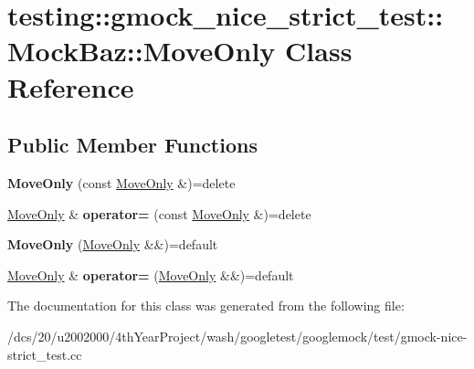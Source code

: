 \hypertarget{classtesting_1_1gmock__nice__strict__test_1_1MockBaz_1_1MoveOnly}{}\section{testing\+:\+:gmock\+\_\+nice\+\_\+strict\+\_\+test\+:\+:Mock\+Baz\+:\+:Move\+Only Class Reference}
\label{classtesting_1_1gmock__nice__strict__test_1_1MockBaz_1_1MoveOnly}
\subsection*{Public Member Functions}
\begin{DoxyCompactItemize}
\item 
\mbox{\label{classtesting_1_1gmock__nice__strict__test_1_1MockBaz_1_1MoveOnly_a1d65fbd2e662ac36766eddd1afc27dc5}} 
{\bfseries Move\+Only} (const \mbox{\hyperlink{classtesting_1_1gmock__nice__strict__test_1_1MockBaz_1_1MoveOnly}{Move\+Only}} \&)=delete
\item 
\mbox{\label{classtesting_1_1gmock__nice__strict__test_1_1MockBaz_1_1MoveOnly_ab2fb7928f447be64460417dd63e55b1d}} 
\mbox{\hyperlink{classtesting_1_1gmock__nice__strict__test_1_1MockBaz_1_1MoveOnly}{Move\+Only}} \& {\bfseries operator=} (const \mbox{\hyperlink{classtesting_1_1gmock__nice__strict__test_1_1MockBaz_1_1MoveOnly}{Move\+Only}} \&)=delete
\item 
\mbox{\label{classtesting_1_1gmock__nice__strict__test_1_1MockBaz_1_1MoveOnly_add8e748eb951f33836f483c258e0236a}} 
{\bfseries Move\+Only} (\mbox{\hyperlink{classtesting_1_1gmock__nice__strict__test_1_1MockBaz_1_1MoveOnly}{Move\+Only}} \&\&)=default
\item 
\mbox{\label{classtesting_1_1gmock__nice__strict__test_1_1MockBaz_1_1MoveOnly_a8087ccdb93d18a866b948620f6bb9cff}} 
\mbox{\hyperlink{classtesting_1_1gmock__nice__strict__test_1_1MockBaz_1_1MoveOnly}{Move\+Only}} \& {\bfseries operator=} (\mbox{\hyperlink{classtesting_1_1gmock__nice__strict__test_1_1MockBaz_1_1MoveOnly}{Move\+Only}} \&\&)=default
\end{DoxyCompactItemize}


The documentation for this class was generated from the following file\+:\begin{DoxyCompactItemize}
\item 
/dcs/20/u2002000/4th\+Year\+Project/wash/googletest/googlemock/test/gmock-\/nice-\/strict\+\_\+test.\+cc\end{DoxyCompactItemize}
